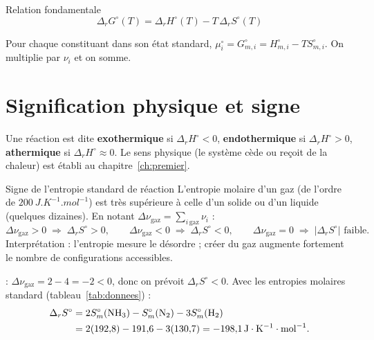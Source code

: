\begin{resultat}{Relation fondamentale}
\[ \boxed{\Delta_rG^\circ(T) = \Delta_rH^\circ(T) - T\,\Delta_rS^\circ(T)} \]
\end{resultat}

\begin{demo}
Pour chaque constituant dans son état standard, $\mu_i^\circ = G^\circ_{m,i} = H^\circ_{m,i} - TS^\circ_{m,i}$. On multiplie par $\nu_i$ et on somme.
\end{demo}

\section{Signification physique et signe}

\begin{definition}
Une réaction est dite \textbf{exothermique} si $\Delta_rH^\circ < 0$, \textbf{endothermique} si $\Delta_rH^\circ > 0$, \textbf{athermique} si $\Delta_rH^\circ \approx 0$. Le sens physique (le système cède ou reçoit de la chaleur) est établi au chapitre~\ref{ch:premier}.
\end{definition}

\begin{resultat}{Signe de l'entropie standard de réaction}
L'entropie molaire d'un gaz (de l'ordre de $\SI{200}{J.K^{-1}.mol^{-1}}$) est très supérieure à celle d'un solide ou d'un liquide (quelques dizaines). En notant $\Delta\nu_{\text{gaz}} = \sum_{i\,\text{gaz}}\nu_i$ :
\[ \Delta\nu_{\text{gaz}} > 0 \;\Rightarrow\; \Delta_rS^\circ > 0, \qquad \Delta\nu_{\text{gaz}} < 0 \;\Rightarrow\; \Delta_rS^\circ < 0, \qquad \Delta\nu_{\text{gaz}} = 0 \;\Rightarrow\; |\Delta_rS^\circ| \text{ faible}. \]
Interprétation : l'entropie mesure le désordre ; créer du gaz augmente fortement le nombre de configurations accessibles.
\end{resultat}

\begin{exemple}
 : $\Delta\nu_{\text{gaz}} = 2 - 4 = -2 < 0$, donc on prévoit $\Delta_rS^\circ < 0$. Avec les entropies molaires standard (tableau~\ref{tab:donnees}) :
\begin{align*} \Delta_rS^\circ &= 2S^\circ_m(\ce{NH3}) - S^\circ_m(\ce{N2}) - 3S^\circ_m(\ce{H2})\\ &= 2(192{,}8) - 191{,}6 - 3(130{,}7) = \SI{-198,1}{J.K^{-1}.mol^{-1}}. \end{align*}
\end{exemple}

